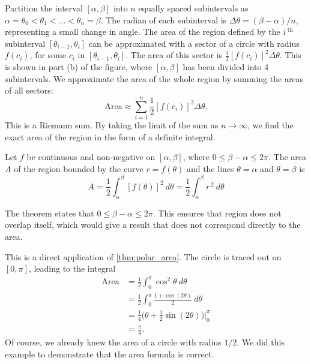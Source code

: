 Partition the interval $[\alpha,\beta]$ into $n$ equally spaced subintervals as $\alpha=\theta_0<\theta_1<\dotso<\theta_n=\beta$. The radian of each subinterval is $\Delta\theta = (\beta-\alpha)/n$, representing a small change in angle. The area of the region defined by the $i\,^\text{th}$ subinterval $[\theta_{i-1},\theta_i]$ can be approximated with a sector of a circle with radius $f(c_i)$, for some $c_i$ in $[\theta_{i-1},\theta_i]$. The area of this sector is $\frac12[f(c_i)]^2\Delta\theta$. This is shown in part (b) of the figure, where $[\alpha,\beta]$ has been divided into 4 subintervals. We approximate the area of the whole region by summing the areas of all sectors:
\[\text{Area} \approx \sum_{i=1}^n \frac12[f(c_i)]^2\Delta\theta.\]
This is a Riemann sum. By taking the limit of the sum as $n\to\infty$, we find the exact area of the region in the form of a definite integral.

{Let $f$ be continuous and non-negative on $[\alpha,\beta]$, where $0\leq \beta-\alpha\leq 2\pi$. The area  $A$ of the region bounded by the curve $r=f(\theta)$ and the lines $\theta=\alpha$ and $\theta=\beta$ is 
\[
A=\frac12\int_\alpha^\beta[f(\theta)]^2 \ d\theta
=\frac12\int_\alpha^\beta r^{\,2} \ d\theta
\]}

The theorem states that $0\leq \beta-\alpha\leq 2\pi$. This ensures that region does not overlap itself, which would give a result that does not correspond directly to the area.

{This is a direct application of \autoref{thm:polar_area}. The circle is traced out on $[0,\pi]$, leading to the integral
\begin{align*}
	\text{Area} &= \frac12\int_0^\pi \cos^2\theta\ d  \theta \\
	&= \frac12\int_0^\pi \frac{1+\cos(2\theta)}{2}\ d\theta\\
	&= \frac14\big(\theta +\frac12\sin(2\theta)\big)\Bigg|_0^\pi\\
	&= \frac\pi4.
\end{align*}
Of course, we already knew the area of a circle with radius $1/2$. We did this example to demonstrate that the area formula is correct.}

